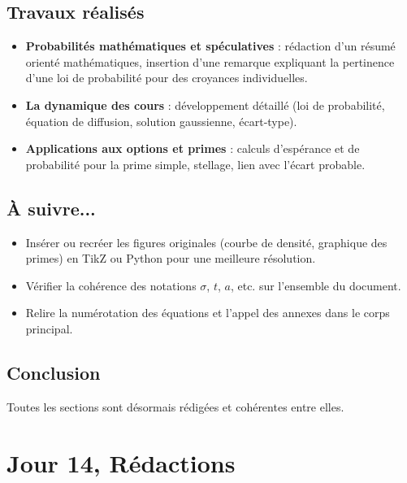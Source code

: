 \documentclass[a4paper,11pt]{article}
\begin{document}
\subsection{Travaux réalisés}
\begin{itemize}
    \item \textbf{Probabilités mathématiques et spéculatives} : rédaction d’un résumé orienté mathématiques, insertion d’une remarque expliquant la pertinence d’une loi de probabilité pour des croyances individuelles.
    \item \textbf{La dynamique des cours} : développement détaillé (loi de probabilité, équation de diffusion, solution gaussienne, écart‐type).
    \item \textbf{Applications aux options et primes} : calculs d’espérance et de probabilité pour la prime simple, stellage, lien avec l’écart probable.
\end{itemize}

\subsection{À suivre...}
\begin{itemize}
    \item Insérer ou recréer les figures originales (courbe de densité, graphique des primes) en TikZ ou Python pour une meilleure résolution.
    \item Vérifier la cohérence des notations $\sigma$, $t$, $a$, etc. sur l’ensemble du document.
    \item Relire la numérotation des équations et l’appel des annexes dans le corps principal.
\end{itemize}

\subsection{Conclusion}
Toutes les sections sont désormais rédigées et cohérentes entre elles.
\newpage


\section{Jour 14, Rédactions}
\end{document}
